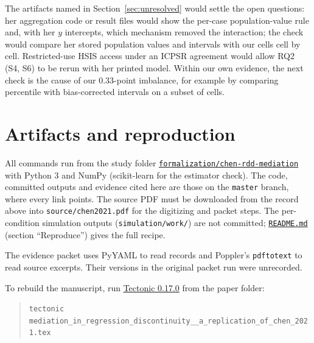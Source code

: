 The artifacts named in Section~\ref{sec:unresolved} would settle the open questions: her aggregation code or result files would show the per-case population-value rule and, with her $y$ intercepts, which mechanism removed the interaction; the check would compare her stored population values and intervals with our cells cell by cell. Restricted-use HSIS access under an ICPSR agreement would allow RQ2 (S4, S6) to be rerun with her printed model. Within our own evidence, the next check is the cause of our 0.33-point imbalance, for example by comparing percentile with bias-corrected intervals on a subset of cells.




\appendix

\section{Artifacts and reproduction}\label{app:artifacts}

All commands run from the study folder \href{https://github.com/alectionary/vibe-math/tree/master/formalization/chen-rdd-mediation}{\nolinkurl{formalization/chen-rdd-mediation}} with Python 3 and NumPy (scikit-learn for the estimator check). The code, committed outputs and evidence cited here are those on the \texttt{master} branch, where every link points. The source PDF must be downloaded from the record above into \texttt{source/chen2021.pdf} for the digitizing and packet steps. The per-condition simulation outputs (\texttt{simulation/work/}) are not committed; \href{https://github.com/alectionary/vibe-math/blob/master/formalization/chen-rdd-mediation/README.md}{\nolinkurl{README.md}} (section ``Reproduce'') gives the full recipe.

The evidence packet uses PyYAML \citep{pyyamlsoftware} to read records and Poppler's \texttt{pdftotext} \citep{popplersoftware} to read source excerpts. Their versions in the original packet run were unrecorded.

To rebuild the manuscript, run \href{https://tectonic-typesetting.github.io/en-US/}{Tectonic 0.17.0} \citep{tectonicsoftware} from the paper folder:
\begin{quote}
\small\verb|tectonic mediation_in_regression_discontinuity__a_replication_of_chen_2021.tex|
\end{quote}

